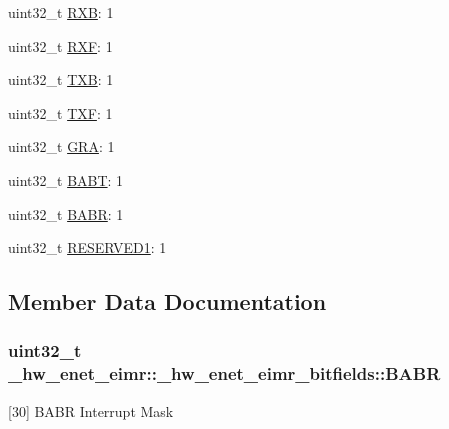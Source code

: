 \begin{DoxyCompactItemize}
\item 
uint32\+\_\+t \hyperlink{struct__hw__enet__eimr_1_1__hw__enet__eimr__bitfields_a920bc29a6ea2d4b1bca6acbb3fc7a225}{R\+XB}\+: 1
\item 
uint32\+\_\+t \hyperlink{struct__hw__enet__eimr_1_1__hw__enet__eimr__bitfields_a342ab8594aefbb34b9ef665f95146338}{R\+XF}\+: 1
\item 
uint32\+\_\+t \hyperlink{struct__hw__enet__eimr_1_1__hw__enet__eimr__bitfields_ad249992b2d527151512e81d1c6a94c30}{T\+XB}\+: 1
\item 
uint32\+\_\+t \hyperlink{struct__hw__enet__eimr_1_1__hw__enet__eimr__bitfields_ad69ad7107fef5b4c74da16732c268127}{T\+XF}\+: 1
\item 
uint32\+\_\+t \hyperlink{struct__hw__enet__eimr_1_1__hw__enet__eimr__bitfields_ade6fc7e6d326fdbdd621e5ff04f893f8}{G\+RA}\+: 1
\item 
uint32\+\_\+t \hyperlink{struct__hw__enet__eimr_1_1__hw__enet__eimr__bitfields_aac5ec20d5060fdf820d069a00443dfe7}{B\+A\+BT}\+: 1
\item 
uint32\+\_\+t \hyperlink{struct__hw__enet__eimr_1_1__hw__enet__eimr__bitfields_a62fc997b909680ac3960d0a48a7c7cc6}{B\+A\+BR}\+: 1
\item 
uint32\+\_\+t \hyperlink{struct__hw__enet__eimr_1_1__hw__enet__eimr__bitfields_afe598523399ba4b40d2421de0dfe5901}{R\+E\+S\+E\+R\+V\+E\+D1}\+: 1
\end{DoxyCompactItemize}


\subsection{Member Data Documentation}
\subsubsection[{\texorpdfstring{B\+A\+BR}{BABR}}]{\setlength{\rightskip}{0pt plus 5cm}uint32\+\_\+t \+\_\+hw\+\_\+enet\+\_\+eimr\+::\+\_\+hw\+\_\+enet\+\_\+eimr\+\_\+bitfields\+::\+B\+A\+BR}\hypertarget{struct__hw__enet__eimr_1_1__hw__enet__eimr__bitfields_a62fc997b909680ac3960d0a48a7c7cc6}{}\label{struct__hw__enet__eimr_1_1__hw__enet__eimr__bitfields_a62fc997b909680ac3960d0a48a7c7cc6}
\mbox{[}30\mbox{]} B\+A\+BR Interrupt Mask 
